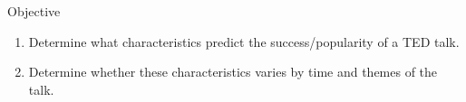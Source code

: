 \begin{frame}{Objective}
\begin{enumerate}
        \item Determine what characteristics predict the success/popularity of a TED talk. 
        \item Determine whether these characteristics varies by time and themes of the talk.
\end{enumerate}
\end{frame}